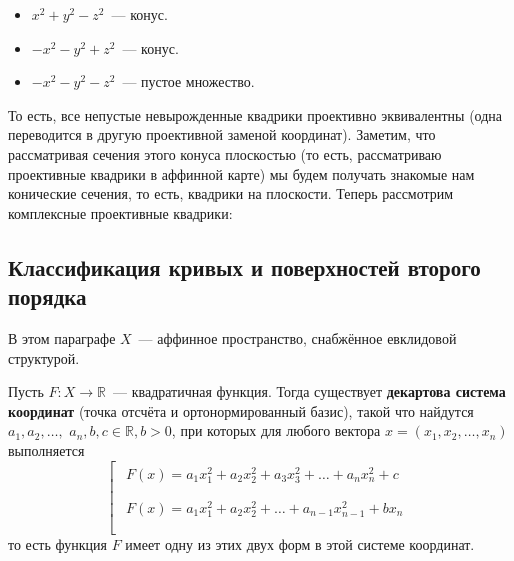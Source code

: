 \documentclass[11pt]{article}
\begin{document}
\begin{remark}
\begin{itemize}
        \item $x^2 + y^2 - z^2$~--- конус.

        \item $-x^2 - y^2 + z^2$~--- конус.

        \item $-x^2 - y^2 - z^2$~--- пустое множество.
    \end{itemize}
    То есть, все непустые невырожденные квадрики проективно эквивалентны (одна переводится в другую проективной заменой координат).
    Заметим, что рассматривая сечения этого конуса плоскостью (то есть, рассматриваю проективные квадрики в аффинной карте) мы будем получать
    знакомые нам конические сечения, то есть, квадрики на плоскости.
    Теперь рассмотрим комплексные проективные квадрики:

    \subsection{Классификация кривых и поверхностей второго порядка}

    В этом параграфе $X$~--- аффинное пространство, снабжённое евклидовой структурой.

    \begin{theorem}
    Пусть $F: X \to \mathbb{R}$~--- квадратичная функция. Тогда существует \textbf{декартова система координат} (точка отсчёта и ортонормированный базис), такой что найдутся $a_1, a_2, \hdots,$  $a_n, b, c \in \mathbb{R}, b > 0$, при которых для любого вектора $x = (x_1, x_2, \hdots, x_n)$ выполняется
    \begin{equation*}
        \left[
      \begin{gathered}
          \begin{gathered}
            F(x) = a_1x_1^2 + a_2x_2^2 + a_3x_3^2 + \hdots + a_nx_n^2 + c
            \\
          \end{gathered}
        \\
          \begin{gathered}
            F(x) = a_1x_1^2 + a_2x_2^2 + \hdots + a_{n-1}x_{n-1}^2 + bx_n
            \\
          \end{gathered}
        \\
      \end{gathered}
    \right.
    \end{equation*}
    то есть функция $F$ имеет одну из этих двух форм в этой системе координат.\end{theorem}



\end{remark}
\end{document}
